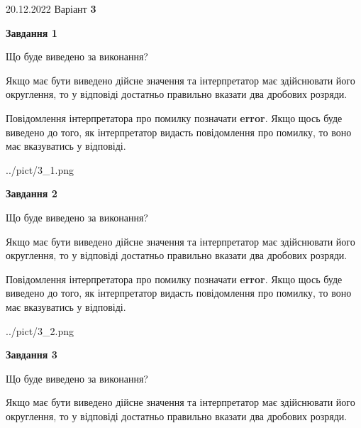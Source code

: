 \documentclass[12pt, ukrainian]{article}
\begin{document}
{20.12.2022 Варіант \No \textbf { 3 }\par}
{
\begin {Large}

{\begin {center}\textbf{Завдання 1}\end {center}}\par
Що буде виведено за виконання? \par

Якщо має бути виведено дійсне значення та інтерпретатор має здійснювати його округлення, 
то у відповіді достатньо правильно вказати два дробових розряди.

Повідомлення інтерпретатора про помилку позначати \textbf{error}.
Якщо щось буде виведено до того, як інтерпретатор видасть повідомлення про помилку, 
то воно має вказуватись у відповіді. \par

\begin{center}
	{../pict/3_1.png}
\end{center}
\newpage

{\begin {center}\textbf{Завдання 2}\end {center}}\par
Що буде виведено за виконання? \par

Якщо має бути виведено дійсне значення та інтерпретатор має здійснювати його округлення, 
то у відповіді достатньо правильно вказати два дробових розряди.

Повідомлення інтерпретатора про помилку позначати \textbf{error}.
Якщо щось буде виведено до того, як інтерпретатор видасть повідомлення про помилку, 
то воно має вказуватись у відповіді. \par

\begin{center}
	{../pict/3_2.png}
\end{center}
\newpage

{\begin {center}\textbf{Завдання 3}\end {center}}\par
Що буде виведено за виконання? \par

Якщо має бути виведено дійсне значення та інтерпретатор має здійснювати його округлення, 
то у відповіді достатньо правильно вказати два дробових розряди.


\end{Large}}
\end{document}
